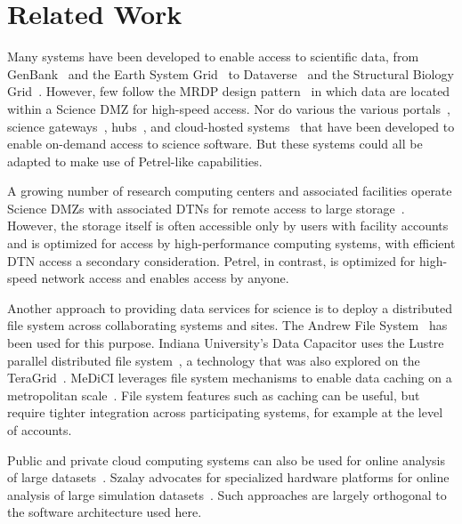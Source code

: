 \documentclass[sigconf]{acmart}
\newcommand\ian[1]{}
\newcommand\ian[1]{{\color{blue}[Ian: #1]}}
\begin{document}


\section{Related Work}

Many systems have been developed to enable access to scientific data,
from GenBank~\cite{benson2012genbank} and the
Earth System Grid~\cite{doi:10.1175/2008BAMS2459.1} to Dataverse~\citep{meyer15pub}
and the Structural Biology Grid~\cite{meyer15pub}.
However, few follow the MRDP design pattern~\cite{BMRDP} in which data are located within a Science DMZ
for high-speed access.
Nor do various the various portals~\citep{russell2001astrophysics}, 
science gateways~\citep{wilkins2008teragrid,lawrence2015science}, 
hubs~\citep{klimeck2008nanohub,mclennan2010hubzero}, 
and cloud-hosted systems~\cite{babuju16kotta} that have been developed to
enable on-demand access to science software.
But these systems could all be adapted to make use of Petrel-like capabilities.

A growing number of research computing centers and associated facilities operate
Science DMZs with associated DTNs for remote access to large storage~\cite{dart2014science}.
However, the storage itself is often accessible only by users with facility
accounts and is optimized for access by high-performance computing 
systems, with efficient DTN access a secondary consideration.
Petrel, in contrast, is optimized for high-speed network access and enables access by anyone.

Another approach to providing data services for science is to deploy a distributed file
system across collaborating systems and sites.
The Andrew File System~\cite{howard1988scale} has been used for this purpose.
Indiana University's Data Capacitor uses the Lustre parallel distributed file system~\cite{simms2007empowering}, a technology that was also explored on the TeraGrid~\cite{simms2007wide}.
MeDiCI leverages file system mechanisms to enable data caching on a metropolitan scale~\cite{Abramson2017}.
File system features such as caching can be useful,
but require tighter integration across participating systems, for example at the level of accounts.

Public and private cloud computing systems can also be used for online analysis of large datasets~\cite{heath2014bionimbus,CloudBook}.
Szalay advocates for specialized hardware platforms for online analysis of large simulation
datasets~\cite{szalay2014simulations}. 
Such approaches are largely orthogonal to the software architecture used here.
\end{document}
